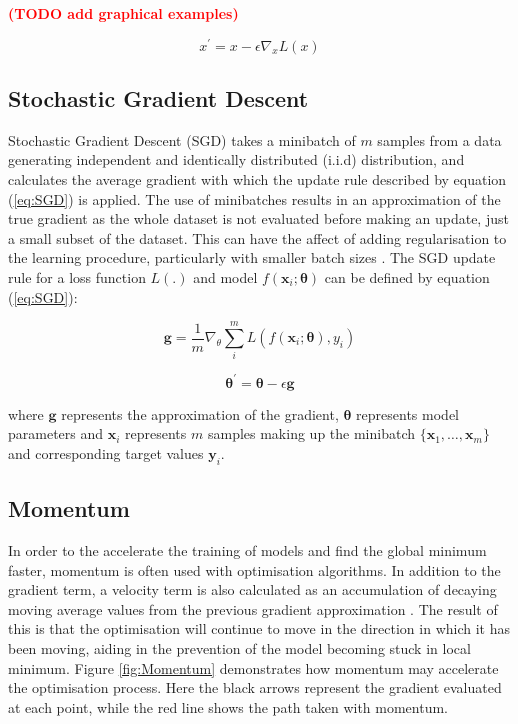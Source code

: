 \textcolor{red}{\textbf{(TODO add graphical examples)}}

\begin{equation}\label{eq:gradient_descent}
   x^\prime = x - \epsilon \nabla_x L(x)
\end{equation}

\subsection{Stochastic Gradient Descent}
Stochastic Gradient Descent (SGD) takes a minibatch of $m$ samples from a data generating independent and identically distributed (i.i.d) distribution, and calculates the average gradient with which the update rule described by equation (\ref{eq:SGD}) is applied.
The use of minibatches results in an approximation of the true gradient as the whole dataset is not evaluated before making an update, just a small subset of the dataset.
This can have the affect of adding regularisation to the learning procedure, particularly with smaller batch sizes \cite{Goodfellow-et-al-2016}.
The SGD update rule for a loss function $L(.)$ and model $f(\bm{x}_i; \bm{\theta})$ can be defined by equation (\ref{eq:SGD}):

\begin{equation*}
    \bm{g} = \frac{1}{m} \nabla_\theta \sum_i^m L(f(\bm{x}_i; \bm{\theta}), y_i)
\end{equation*}

\begin{equation}\label{eq:SGD}
    \bm{\theta}^\prime = \bm{\theta} - \epsilon \bm{g}
\end{equation}

where $\bm{g}$ represents the approximation of the gradient, $\bm{\theta}$ represents model parameters and $\bm{x}_i$ represents $m$ samples making up the minibatch $\{\bm{x}_1, \dots, \bm{x}_m\}$ and corresponding target values $\bm{y}_i$.

\subsection{Momentum}
In order to the accelerate the training of models and find the global minimum faster, momentum is often used with optimisation algorithms.
In addition to the gradient term, a velocity term is also calculated as an accumulation of decaying moving average values from the previous gradient approximation \cite{Goodfellow-et-al-2016}.
The result of this is that the optimisation will continue to move in the direction in which it has been moving, aiding in the prevention of the model becoming stuck in local minimum.
Figure \ref{fig:Momentum} demonstrates how momentum may accelerate the optimisation process.
Here the black arrows represent the gradient evaluated at each point, while the red line shows the path taken with momentum.


